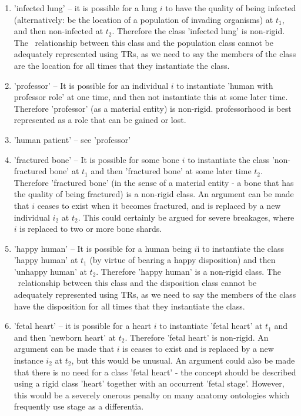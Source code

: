 \documentclass{bioinfo}
\begin{document}
\begin{enumerate}
\item 'infected lung' -- it is possible for a lung $i$ to have the
  quality of being infected (alternatively: be the location of a
  population of invading organisms) at $t_1$, and then non-infected at
  $t_2$. Therefore the class 'infected lung' is non-rigid.  The
  \ relationship between this class and the population
  class cannot be adequately represented using TRs, as we need to say
  the members of the class are the location for all times that they
  instantiate the class.


\item 'professor' -- It is possible for an individual $i$ to
  instantiate 'human with professor role' at one time, and then not
  instantiate this at some later time. Therefore 'professor' (as a
  material entity) is non-rigid. professorhood is best represented as
  a role that can be gained or lost.

  \item 'human patient' -- see 'professor'

  \item 'fractured bone' -- It is possible for some bone $i$ to
    instantiate the class 'non-fractured bone' at $t_1$ and then
    'fractured bone' at some later time $t_2$. Therefore 'fractured
    bone' (in the sense of a material entity - a bone that has the
    quality of being fractured) is a non-rigid class. An argument can
    be made that $i$ ceases to exist when it becomes fractured, and is
    replaced by a new individual $i_2$ at $t_2$. This could certainly
    be argued for severe breakages, where $i$ is replaced to two or
    more bone shards.

  \item 'happy human' -- It is possible for a human being $i$i to
    instantiate the class 'happy human' at $t_1$ (by virtue of bearing
    a happy disposition) and then 'unhappy human' at $t_2$. Therefore
    'happy human' is a non-rigid class. The \
    relationship between this class and the disposition class cannot
    be adequately represented using TRs, as we need to say the members
    of the class have the disposition for all times that they
    instantiate the class.

  \item 'fetal heart' -- it is possible for a heart $i$ to instantiate
    'fetal heart' at $t_1$ and and then 'newborn heart' at
    $t_2$. Therefore 'fetal heart' is non-rigid. An argument can be
    made that $i$ is ceases to exist and is replaced by a new instance
    $i_2$ at $t_2$, but this would be unusual. An argument could also
    be made that there is no need for a class 'fetal heart' - the
    concept should be described using a rigid class 'heart' together
    with an occurrent 'fetal stage'. However, this would be a severely
    onerous penalty on many anatomy ontologies which frequently use
    stage as a differentia.


\end{enumerate}
\end{document}
